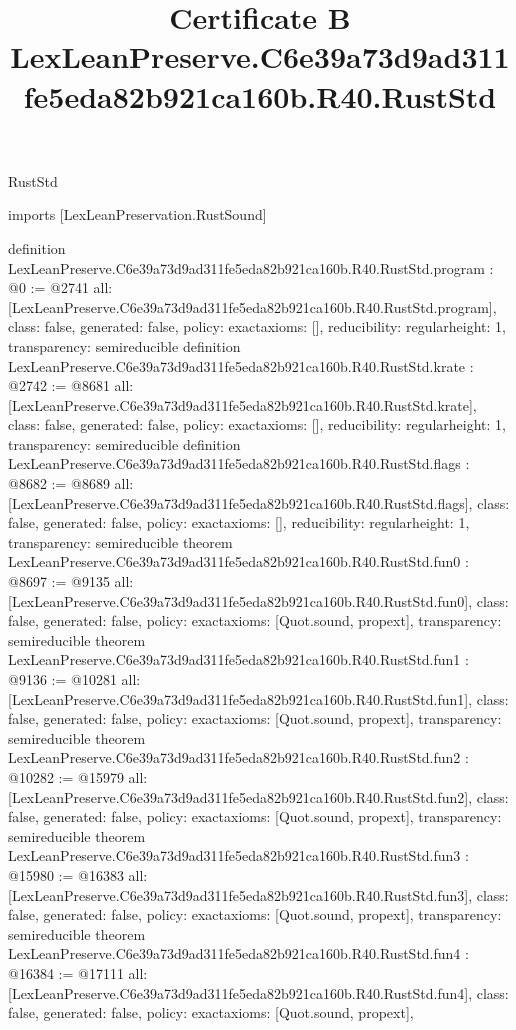 \begin{lexlean}{RustStd}
\title{Certificate B LexLeanPreserve.C6e39a73d9ad311fe5eda82b921ca160b.R40.RustStd}
\begin{coremodule}
imports [LexLeanPreservation.RustSound]

definition LexLeanPreserve.C6e39a73d9ad311fe5eda82b921ca160b.R40.RustStd.program : @0 := @2741 {
  all: [LexLeanPreserve.C6e39a73d9ad311fe5eda82b921ca160b.R40.RustStd.program],
  class: false,
  generated: false,
  policy: exact{axioms: []},
  reducibility: regular{height: 1},
  transparency: semireducible
}
definition LexLeanPreserve.C6e39a73d9ad311fe5eda82b921ca160b.R40.RustStd.krate : @2742 := @8681 {
  all: [LexLeanPreserve.C6e39a73d9ad311fe5eda82b921ca160b.R40.RustStd.krate],
  class: false,
  generated: false,
  policy: exact{axioms: []},
  reducibility: regular{height: 1},
  transparency: semireducible
}
definition LexLeanPreserve.C6e39a73d9ad311fe5eda82b921ca160b.R40.RustStd.flags : @8682 := @8689 {
  all: [LexLeanPreserve.C6e39a73d9ad311fe5eda82b921ca160b.R40.RustStd.flags],
  class: false,
  generated: false,
  policy: exact{axioms: []},
  reducibility: regular{height: 1},
  transparency: semireducible
}
theorem LexLeanPreserve.C6e39a73d9ad311fe5eda82b921ca160b.R40.RustStd.fun0 : @8697 := @9135 {
  all: [LexLeanPreserve.C6e39a73d9ad311fe5eda82b921ca160b.R40.RustStd.fun0],
  class: false,
  generated: false,
  policy: exact{axioms: [Quot.sound, propext]},
  transparency: semireducible
}
theorem LexLeanPreserve.C6e39a73d9ad311fe5eda82b921ca160b.R40.RustStd.fun1 : @9136 := @10281 {
  all: [LexLeanPreserve.C6e39a73d9ad311fe5eda82b921ca160b.R40.RustStd.fun1],
  class: false,
  generated: false,
  policy: exact{axioms: [Quot.sound, propext]},
  transparency: semireducible
}
theorem LexLeanPreserve.C6e39a73d9ad311fe5eda82b921ca160b.R40.RustStd.fun2 : @10282 := @15979 {
  all: [LexLeanPreserve.C6e39a73d9ad311fe5eda82b921ca160b.R40.RustStd.fun2],
  class: false,
  generated: false,
  policy: exact{axioms: [Quot.sound, propext]},
  transparency: semireducible
}
theorem LexLeanPreserve.C6e39a73d9ad311fe5eda82b921ca160b.R40.RustStd.fun3 : @15980 := @16383 {
  all: [LexLeanPreserve.C6e39a73d9ad311fe5eda82b921ca160b.R40.RustStd.fun3],
  class: false,
  generated: false,
  policy: exact{axioms: [Quot.sound, propext]},
  transparency: semireducible
}
theorem LexLeanPreserve.C6e39a73d9ad311fe5eda82b921ca160b.R40.RustStd.fun4 : @16384 := @17111 {
  all: [LexLeanPreserve.C6e39a73d9ad311fe5eda82b921ca160b.R40.RustStd.fun4],
  class: false,
  generated: false,
  policy: exact{axioms: [Quot.sound, propext]},
}
\end{coremodule}
\end{lexlean}
